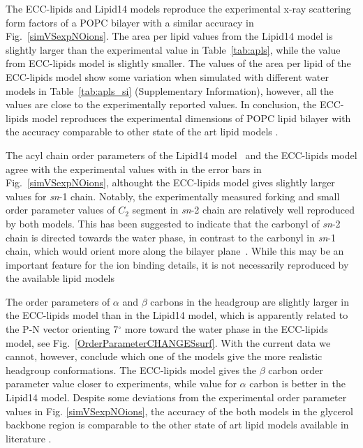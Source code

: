 \documentclass[aip,jcp,twocolumn]{revtex4}
\begin{document}
The ECC-lipids and Lipid14 models reproduce the experimental x-ray scattering form factors
of a POPC bilayer with a similar accuracy in Fig.~\ref{simVSexpNOions}.
The area per lipid values from the Lipid14 model is slightly larger than the
experimental value in Table~\ref{tab:apls}, while the value from ECC-lipids model
is slightly smaller. The values of the area per lipid of the ECC-lipids model show some variation
when simulated with different water models in Table~\ref{tab:apls_si} (Supplementary Information),
however, all the values are close to the experimentally reported values.
In conclusion, the ECC-lipids model reproduces the experimental dimensions of POPC
lipid bilayer with the accuracy comparable to other state of the art lipid models \cite{ollila16}.

The acyl chain order parameters of the Lipid14 model~\cite{dickson14} and the
ECC-lipids model agree with the experimental values with in the error bars
in Fig.~\ref{simVSexpNOions}, althought the ECC-lipids model gives slightly larger
values for {\it sn}-1 chain. Notably, the experimentally measured forking and
small order parameter values of $C_2$ segment in {\it sn}-2 chain are relatively well
reproduced by both models. This has been suggested to indicate that the carbonyl
of {\it sn}-2 chain is directed towards the water phase, in contrast to the
carbonyl in {\it sn}-1 chain, which would orient more along the bilayer
plane~\cite{seelig75,schindler75,gawrisch92}. While this may be an important
feature for the ion binding details, it is not necessarily reproduced by the
available lipid models~\cite{ollila16}

The order parameters of $\alpha$ and $\beta$ carbons in the headgroup are slightly larger
in the ECC-lipids model than in the Lipid14 model, which is apparently related to the
P-N vector orienting 7$^{\circ}$ more toward the water phase in the ECC-lipids model, 
see Fig.~\ref{OrderParameterCHANGESsurf}. With the current data we cannot,
however, conclude which one of the models give the more realistic
headgroup conformations. The ECC-lipids model gives
the $\beta$ carbon order parameter value closer to experiments, while
value for $\alpha$ carbon is better in the Lipid14 model.
Despite some deviations from the experimental order parameter values
in Fig. \ref{simVSexpNOions},
the accuracy of the both models in the glycerol backbone region
is comparable to the other state
of art lipid models available in literature \cite{botan15}.
\end{document}
